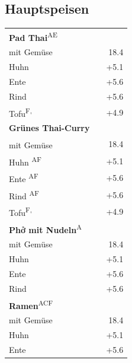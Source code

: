 \documentclass[a4paper,12pt]{article}
\newcommand{\vegan}{\textbf{\scriptsize \color{vegan}{Vegan}}}
\begin{document}
\begin{multicols}{2}
\section*{Hauptspeisen}
\begin{tabular}{Lrr}
\textbf{Pad Thai}\textsuperscript{{\scriptsize AE}}\\
\hspace{0.4cm}mit Gemüse & & 18.4\\
\hspace{0.4cm}Huhn & & +5.1\\
\hspace{0.4cm}Ente & & +5.6\\
\hspace{0.4cm}Rind & & +5.6\\
\hspace{0.4cm}Tofu\textsuperscript{{\scriptsize F, \vegan}} & & +4.9\\
\textbf{Grünes Thai-Curry}\\
\hspace{0.4cm}mit Gemüse\textsuperscript{\vegan} & & 18.4\\
\hspace{0.4cm}Huhn \textsuperscript{{\scriptsize AF}} & & +5.1\\
\hspace{0.4cm}Ente \textsuperscript{{\scriptsize AF}} & & +5.6\\
\hspace{0.4cm}Rind \textsuperscript{{\scriptsize AF}} & & +5.6\\
\hspace{0.4cm}Tofu\textsuperscript{{\scriptsize F, \vegan}} & & +4.9\\
\textbf{Phở mit Nudeln}\textsuperscript{{\scriptsize A}}\\
\hspace{0.4cm}mit Gemüse & & 18.4\\
\hspace{0.4cm}Huhn & & +5.1\\
\hspace{0.4cm}Ente & & +5.6\\
\hspace{0.4cm}Rind & & +5.6\\
\textbf{Ramen}\textsuperscript{{\scriptsize ACF}}\\
\hspace{0.4cm}mit Gemüse & & 18.4\\
\hspace{0.4cm}Huhn & & +5.1\\
\hspace{0.4cm}Ente & & +5.6\\

\end{tabular}
\end{multicols}
\end{document}
